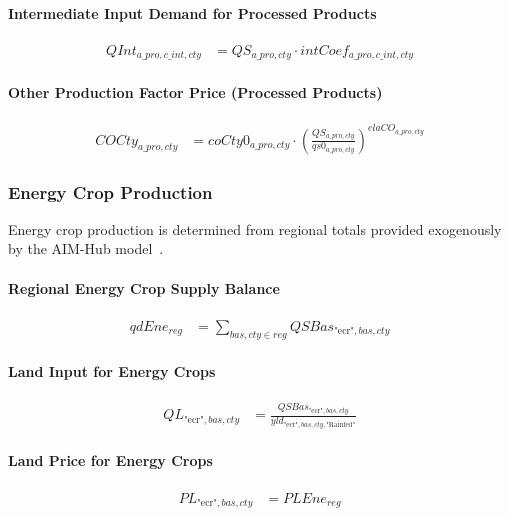 \paragraph{Intermediate Input Demand for Processed Products}
\begin{align}
  QInt_{a\_pro,c\_int,cty}
  &= QS_{a\_pro,cty}
     \cdot
     intCoef_{a\_pro,c\_int,cty}
  \tag{QIntEq}\label{eq:QIntEq}
\end{align}

\paragraph{Other Production Factor Price (Processed Products)}
\begin{align}
  COCty_{a\_pro,cty}
  &= coCty0_{a\_pro,cty}
     \cdot
     \left(
       \frac{
         QS_{a\_pro,cty}
       }{
         qs0_{a\_pro,cty}
       }
     \right)^{elaCO_{a\_pro,cty}}
  \tag{COProEq}\label{eq:COProEq}
\end{align}

\subsubsection{Energy Crop Production}
Energy crop production is determined from regional totals provided exogenously by the AIM-Hub model~\cite{fujimoriSSP3AIMImplementation2017}.


\paragraph{Regional Energy Crop Supply Balance}
\begin{align}
  qdEne_{reg}
  &= \sum_{bas,cty \in reg}
     QSBas_{\text{"ecr"},bas,cty}
  \tag{EneBalEq}\label{eq:EneBalEq}
\end{align}

\paragraph{Land Input for Energy Crops}
\begin{align}
  QL_{\text{"ecr"},bas,cty}
  &= \frac{
       QSBas_{\text{"ecr"},bas,cty}
     }{
       yld_{\text{"ecr"},bas,cty,\text{"Rainfed"}}
     }
  \tag{EneLandEq}\label{eq:EneLandEq}
\end{align}

\paragraph{Land Price for Energy Crops}
\begin{align}
  PL_{\text{"ecr"},bas,cty}
  &= PLEne_{reg}
  \tag{PLEneEq}\label{eq:PLEneEq}
\end{align}


